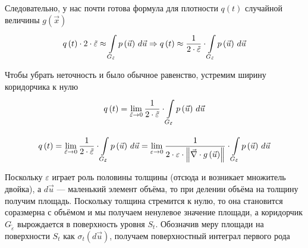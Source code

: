 Следовательно, у нас почти готова формула для плотности $q\left( t \right)$
случайной величины $g\left( \vec{x} \right)$
$$q\left( t \right) \cdot 2 \cdot \tilde{\varepsilon}
      \approx \integrall{G_{\tilde{\varepsilon}}}{d\vec{u}}{\pdf{\vec{u}}}
      \Rightarrow q\left( t \right)
      \approx \frac{1}{2 \cdot \tilde{\varepsilon}}
      \cdot \integrall{G_{\tilde{\varepsilon}}}{d\vec{u}}{
    \pdf{\vec{u}}}$$

Чтобы убрать неточность и было обычное равенство,
устремим ширину коридорчика к нулю
\begin{equation}\label{isosurfaceDencity}
  q\left( t \right)
      = \lim_{\tilde{\varepsilon} \to 0} \frac{1}{2 \cdot \tilde{\varepsilon}}
      \cdot \integrall{G_{\tilde{\varepsilon}}}{d\vec{u}}{\pdf{\vec{u}}}
\end{equation}

\begin{comment}
Распишем $\tilde{\varepsilon}$, воспользовавшись формулой \eqref{widthEpsilon}
$$\varepsilon
  \approx \frac{\tilde{\varepsilon}}
      {\left\| \vec{\nabla} \cdot {g\left( \vec{u} \right)} \right\|}
  \Rightarrow
      \tilde{\varepsilon} \approx \varepsilon
      \cdot \left\| \vec{\nabla} \cdot g\left( \vec{u} \right) \right\|$$

Вернёмся к плотности в формуле \eqref{isosurfaceDencity}.
Заменив $\tilde{\varepsilon}$ на $\varepsilon
\cdot \left\| \vec{\nabla} \cdot g\left( \vec{u} \right) \right\|$,
нужно разобраться, что теперь нужно устремлять к нулю.
Поскольку модуль градиента --- величина, зависящая от координат,
и стремиться к нулю будет лишь при изменении поведения функции,
то устремлять будем $\varepsilon$ (толщину кокона)
\end{comment}
$$q\left( t \right)
      = \lim_{\tilde{\varepsilon} \to 0} \frac{1}{2 \cdot \tilde{\varepsilon}}
      \cdot \integrall{G_{\tilde{\varepsilon}}}{d\vec{u}}{\pdf{\vec{u}}}
      = \lim_{\varepsilon \to 0} \frac{1}{2 \cdot \varepsilon
      \cdot \left\| \vec{\nabla} \cdot g\left( \vec{u} \right) \right\|}
      \cdot \integrall{G_{\tilde{\varepsilon}}}{d\vec{u}}{\pdf{\vec{u}}}$$

Поскольку $\varepsilon$ играет роль половины толщины
(отсюда и возникает множитель двойка),
а $d\vec{u}$ --- маленький элемент объёма,
то при делении объёма на толщину получим площадь.
Поскольку толщина стремится к нулю,
то она становится соразмерна с объёмом и мы получаем ненулевое значение площади,
а коридорчик $G_{\tilde{\varepsilon}}$ вырождается в поверхность уровня $S_t$.
Обозначив меру площади на поверхности $S_t$ как
$\sigma_{t}\left( d\vec{u} \right)$,
получаем поверхностный интеграл первого рода

